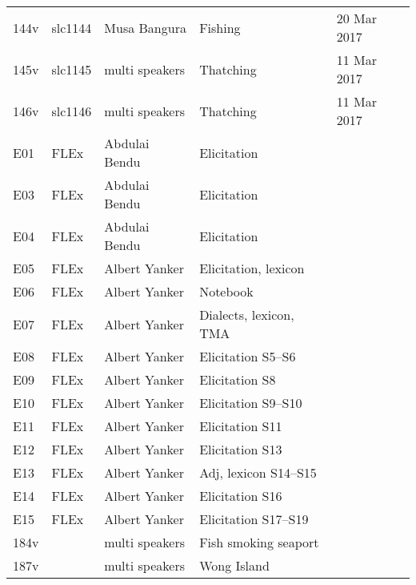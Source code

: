 \begin{xltabular}{\textwidth}{lllQl}
144v & slc1144 & Musa Bangura & Fishing & 20 Mar 2017\\
145v & slc1145 & multi speakers & Thatching & 11 Mar 2017\\
146v & slc1146 & multi speakers & Thatching & 11 Mar 2017\\
E01 & FLEx & Abdulai Bendu & Elicitation & \\
E03 & FLEx & Abdulai Bendu & Elicitation & \\
E04 & FLEx & Abdulai Bendu & Elicitation & \\
E05 & FLEx & Albert Yanker & Elicitation, lexicon & \\
E06 & FLEx & Albert Yanker & Notebook & \\
E07 & FLEx & Albert Yanker & Dialects, lexicon, TMA & \\ 
E08 & FLEx & Albert Yanker & Elicitation S5--S6& \\
E09 & FLEx & Albert Yanker & Elicitation S8 & \\
E10 & FLEx & Albert Yanker & Elicitation S9--S10 & \\
E11 & FLEx & Albert Yanker & Elicitation S11 & \\
E12 & FLEx & Albert Yanker & Elicitation S13 & \\
E13 & FLEx & Albert Yanker & Adj, lexicon S14--S15 & \\
E14 & FLEx & Albert Yanker & Elicitation S16 & \\
E15 & FLEx & Albert Yanker & Elicitation S17--S19 & \\ 
184v & & multi speakers & Fish smoking seaport & \\
187v & & multi speakers & Wong Island & \\
\end{xltabular}


